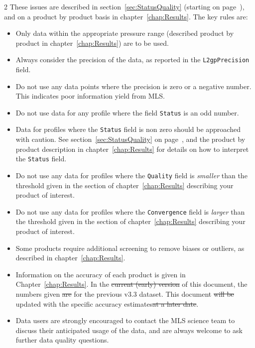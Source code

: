 \documentclass[11pt,draft]{report}
\providecommand{\DIFaddtex}[1]{{\protect\color{blue}\uwave{#1}}} %
\providecommand{\DIFdeltex}[1]{{\protect\color{red}\sout{#1}}}                      %
\providecommand{\DIFaddbegin}{} %
\providecommand{\DIFaddend}{} %
\providecommand{\DIFdelbegin}{} %
\providecommand{\DIFdelend}{} %
\providecommand{\DIFadd}[1]{\texorpdfstring{\DIFaddtex{#1}}{#1}} %
\providecommand{\DIFdel}[1]{\texorpdfstring{\DIFdeltex{#1}}{}} %
\begin{document}
\begin{multicols}{2}
These issues are described in section~\ref{sec:StatusQuality} (starting
on page~\pageref{sec:StatusQuality}), and on a product by product basis
in chapter~\ref{chap:Results}.  The key rules are:
\begin{itemize}[leftmargin=2ex]
\item Only data within the appropriate pressure range (described product
  by product in chapter~\ref{chap:Results}) are to be used.
\item Always consider the precision of the data, as reported in the
  \texttt{L2gpPrecision} field.
\item Do not use any data points where the precision is zero or a
  negative number.  This indicates poor information yield from MLS.
\item Do not use data for any profile where the field \texttt{Status} is
  an odd number.
\item Data for profiles where the \texttt{Status} field is non zero
  should be approached with caution.  See
  section~\ref{sec:StatusQuality} on page~\pageref{sec:StatusQuality},
  and the product by product description in chapter~\ref{chap:Results}
  for details on how to interpret the \texttt{Status} field.
\item Do not use any data for profiles where the \texttt{Quality} field
  is \emph{smaller} than the threshold given in the section of
  chapter~\ref{chap:Results} describing your product of interest.
\item Do not use any data for profiles where the \texttt{Convergence}
  field is \emph{larger} than the threshold given in the section of
  chapter~\ref{chap:Results} describing your product of interest.
\item Some products require additional screening to remove biases or
  outliers, as described in chapter~\ref{chap:Results}.
\item Information on the accuracy of each product is given in
  Chapter~\ref{chap:Results}.  In the \DIFdelbegin \DIFdel{current (early) version }\DIFdelend \DIFaddbegin \DIFadd{previous versions }\DIFaddend of this
  document, the numbers given \DIFdelbegin \DIFdel{are }\DIFdelend \DIFaddbegin \DIFadd{were }\DIFaddend for the previous v3.3 dataset.  This
  document \DIFdelbegin \DIFdel{will be }\DIFdelend \DIFaddbegin \DIFadd{has now been }\DIFaddend updated with the specific \thisv accuracy
  estimates\DIFdelbegin \DIFdel{at a later date}\DIFdelend .
\item Data users are strongly encouraged to contact the MLS
  science team to discuss their anticipated usage of the data, and are
  always welcome to ask further data quality questions.
\end{itemize}


\end{multicols}
\end{document}

